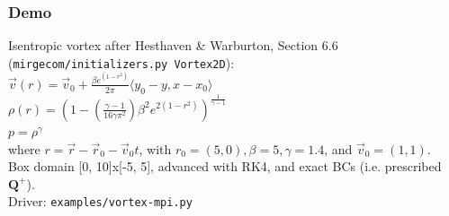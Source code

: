 %
\begin{frame}\frametitle{Demo}
Isentropic vortex after Hesthaven \& Warburton, Section 6.6 (\texttt{mirgecom/initializers.py Vortex2D}):\\
\vspace{.2in}
$\vec{v}(r) = \vec{v}_0 + \frac{\beta{e}^{(1 - r^2)}}{2\pi}\langle{y}_0 - y,x - x_0\rangle$\\
$\rho(r) = ( 1 - (\frac{\gamma-1}{16\gamma\pi^{2}})\beta^{2}{e}^{2(1-r^{2})})^{\frac{1}{\gamma-1}}$\\
$p = \rho^{\gamma}$\\
where $r = \vec{r} - \vec{r}_0 - \vec{v}_0{t}$, with $r_0 = (5, 0), \beta=5, \gamma=1.4$, and $\vec{v}_0 = (1,1)$.\\
\vspace{.2in}
Box domain [0, 10]x[-5, 5], advanced with RK4, and exact BCs (i.e. prescribed $\mathbf{Q}^{+}$).\\
\vspace{.2in}
Driver: \texttt{examples/vortex-mpi.py}
\end{frame}

